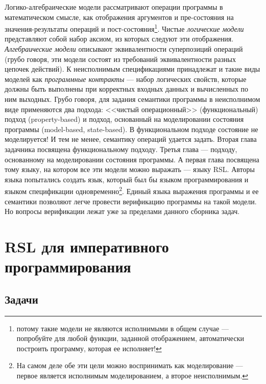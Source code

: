\documentclass[14pt, twoside]{extreport}
\newcounter{problem_type}[chapter]
\begin{document}
Логико-алгебраические модели рассматривают операции программы в математическом смысле, как отображения аргументов и пре-состояния на значения-результаты операций и пост-состояния\footnote{потому такие модели не являются исполнимыми в общем случае --- попробуйте для любой функции, заданной отображением, автоматически построить программу, которая ее исполняет!}. Чистые \emph{логические модели} представляют собой набор аксиом, из которых следуют эти отображения. \emph{Алгебраические модели} описывают эквивалентности суперпозиций операций (грубо говоря, эти модели состоят из требований эквивалентности разных цепочек действий). К неисполнимым спецификациями принадлежат и такие виды моделей как \emph{программные контракты} --- набор логических свойств, которые должны быть выполнены при корректных входных данных и вычисленных по ним выходных. Грубо говоря, для задания семантики программы в неисполнимом виде применяются два подхода: <<чистый операционный>> (функциональный) подход (property-based) и подход, основанный на моделировании состояния программы (model-based, state-based). В функциональном подходе состояние не моделируется! И тем не менее, семантику операций удается задать. Вторая глава задачника посвящена функциональному подходу. Третья глава --- подходу, основанному на моделировании состояния программы. А первая глава посвящена тому языку, на котором все эти модели можно выражать --- языку RSL. Авторы языка попытались создать язык, который был бы языком программирования и языком спецификации одновременно\footnote{На самом деле обе эти цели можно воспринимать как моделирование --- первое является исполнимым моделированием, а второе неисполнимым.}. Единый языка выражения программы и ее семантики позволяют легче провести верификацию программы на такой модели. Но вопросы верификации лежат уже за пределами данного сборника задач.

\chapter{RSL для императивного программирования}



\section*{Задачи}


\end{document}
